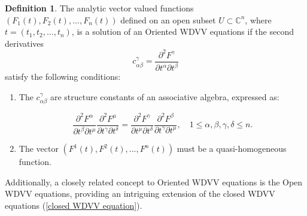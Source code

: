 \documentclass{article}
\theoremstyle{definition}
\newtheorem{definition}{Definition}[section]
\begin{document}
\begin{definition}\cite{Alexander}
The analytic vector valued functions $(F_1(t), F_2(t), ..., F_n(t))$ defined on an open subset $U \subset \mathbb{C}^n$, where $t = (t_1, t_2, ..., t_n)$, is a solution of an Oriented WDVV equations if the second derivatives 
\begin{equation*}
c_{\alpha\beta}^{\gamma} = \frac{\partial^2F^{\gamma}}{\partial t^{\alpha} \partial t^{\beta}}
\end{equation*}
 satisfy the following conditions:

\begin{enumerate}
    \item The $c_{\alpha \beta}^{\gamma}$ are structure constants of an associative algebra, expressed as:
  
    
 \begin{equation}\label{Oriented WDVV equation}
    \frac{\partial^2F^\alpha}{\partial t^\beta \partial t^\mu} \frac{\partial^2F^\mu}{\partial t^\gamma \partial t^\delta} =
    \frac{\partial^2F^\gamma}{\partial t^\mu \partial t^\delta} \frac{\partial^2F^\beta}{\partial t^\gamma \partial t^\mu}, \quad 1 \leq \alpha, \beta, \gamma, \delta \leq n. 
\end{equation}

    \item The vector $(F^1(t), F^2(t), ..., F^n(t))$ must be a quasi-homogeneous function.
\end{enumerate}

Additionally, a closely related concept to Oriented WDVV equations is the Open WDVV equations, providing an intriguing extension of the closed WDVV equations (\ref{closed WDVV equation}).
\end{definition}
\end{document}
